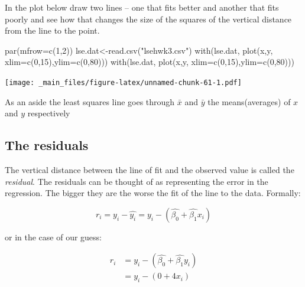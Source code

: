 \documentclass[
]{gitbook}
\newenvironment{Shaded}{\begin{snugshade}}{\end{snugshade}}
\newcommand{\AttributeTok}[1]{\textcolor[rgb]{0.77,0.63,0.00}{#1}}
\newcommand{\DecValTok}[1]{\textcolor[rgb]{0.00,0.00,0.81}{#1}}
\newcommand{\FunctionTok}[1]{\textcolor[rgb]{0.00,0.00,0.00}{#1}}
\newcommand{\NormalTok}[1]{#1}
\newcommand{\OtherTok}[1]{\textcolor[rgb]{0.56,0.35,0.01}{#1}}
\newcommand{\StringTok}[1]{\textcolor[rgb]{0.31,0.60,0.02}{#1}}
\begin{document}
In the plot below draw two lines -- one that fits better and another that fits poorly and see how that changes the size of the squares of the vertical distance from the line to the point.

\begin{Shaded}
\begin{Highlighting}[]
\FunctionTok{par}\NormalTok{(}\AttributeTok{mfrow=}\FunctionTok{c}\NormalTok{(}\DecValTok{1}\NormalTok{,}\DecValTok{2}\NormalTok{))}
\NormalTok{lse.dat}\OtherTok{\textless{}{-}}\FunctionTok{read.csv}\NormalTok{(}\StringTok{"lsehwk3.csv"}\NormalTok{)}
\FunctionTok{with}\NormalTok{(lse.dat, }\FunctionTok{plot}\NormalTok{(x,y, }\AttributeTok{xlim=}\FunctionTok{c}\NormalTok{(}\DecValTok{0}\NormalTok{,}\DecValTok{15}\NormalTok{),}\AttributeTok{ylim=}\FunctionTok{c}\NormalTok{(}\DecValTok{0}\NormalTok{,}\DecValTok{80}\NormalTok{)))}
\FunctionTok{with}\NormalTok{(lse.dat, }\FunctionTok{plot}\NormalTok{(x,y, }\AttributeTok{xlim=}\FunctionTok{c}\NormalTok{(}\DecValTok{0}\NormalTok{,}\DecValTok{15}\NormalTok{),}\AttributeTok{ylim=}\FunctionTok{c}\NormalTok{(}\DecValTok{0}\NormalTok{,}\DecValTok{80}\NormalTok{)))}
\end{Highlighting}
\end{Shaded}

\texttt{[image: \_main\_files/figure-latex/unnamed-chunk-61-1.pdf]}

As an aside the least squares line goes through \(\bar{x}\) and \(\bar{y}\) the means(averages) of \(x\) and \(y\) respectively

\hypertarget{the-residuals}{%
\subsection{The residuals}\label{the-residuals}}

The vertical distance between the line of fit and the observed value is called the \emph{residual}. The residuals can be thought of as representing the error in the regression. The bigger they are the worse the fit of the line to the data. Formally:

\[ r_i= y_i - \hat{y_i} = y_i- (\hat{\beta_0}+\hat{\beta_1}x_i) \]

or in the case of our guess:

\[ \begin{aligned}
r_i & = y_i - (\hat{\beta_0}+\hat{\beta_1}y_i)\\  & = y_i - (0 +  4 x_i) 
\end{aligned}
\]
\end{document}

